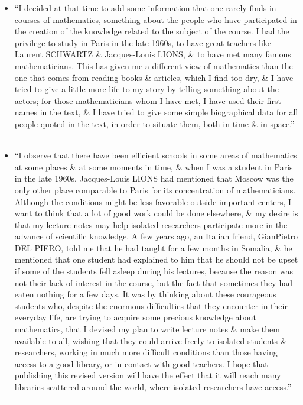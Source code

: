 \documentclass{article}
\begin{document}
\begin{enumerate}
\begin{itemize}
		\item ``I decided at that time to add some information that one rarely finds in courses of mathematics, something about the people who have participated in the creation of the knowledge related to the subject of the course. I had the privilege to study in Paris in the late 1960s, to have great teachers like Laurent SCHWARTZ \& Jacques-Louis LIONS, \& to have met many famous mathematicians. This has given me a different view of mathematics than the one that comes from reading books \& articles, which I find too dry, \& I have tried to give a little more life to my story by telling something about the actors; for those mathematicians whom I have met, I have used their first names in the text, \& I have tried to give some simple biographical data for all people quoted in the text, in order to situate them, both in time \& in space.'' -- \cite[Preface, p. x]{Tartar2006}
		\item ``I observe that there have been efficient schools in some areas of mathematics at some places \& at some moments in time, \& when I was a student in Paris in the late 1960s, Jacques-Louis LIONS had mentioned that Moscow was the only other place comparable to Paris for its concentration of mathematicians. Although the conditions might be less favorable outside important centers, I want to think that a lot of good work could be done elsewhere, \& my desire is that my lecture notes may help isolated researchers participate more in the advance of scientific knowledge. A few years ago, an Italian friend, GianPietro DEL PIERO, told me that he had taught for a few months in Somalia, \& he mentioned that one student had explained to him that he should not be upset if some of the students fell asleep during his lectures, because the reason was not their lack of interest in the course, but the fact that sometimes they had eaten nothing for a few days. It was by thinking about these courageous students who, despite the enormous difficulties that they encounter in their everyday life, are trying to acquire some precious knowledge about mathematics, that I devised my plan to write lecture notes \& make them available to all, wishing that they could arrive freely to isolated students \& researchers, working in much more difficult conditions than those having access to a good library, or in contact with good teachers. I hope that publishing this revised version will have the effect that it will reach many libraries scattered around the world, where isolated researchers have access.'' -- \cite[Preface, p. xi]{Tartar2006}

\end{itemize}
\end{enumerate}
\end{document}
